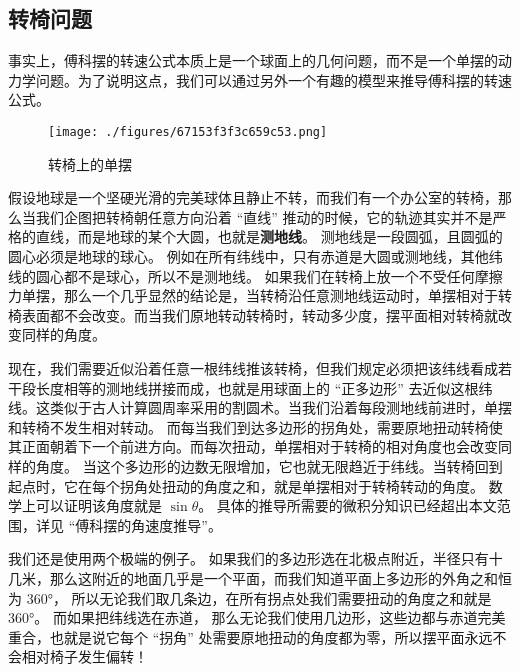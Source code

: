 \subsection{转椅问题}
事实上，傅科摆的转速公式本质上是一个球面上的几何问题，而不是一个单摆的动力学问题。为了说明这点，我们可以通过另外一个有趣的模型来推导傅科摆的转速公式。

\begin{figure}[ht]
\centering
\texttt{[image: ./figures/67153f3f3c659c53.png]}
\caption{转椅上的单摆} \label{fig_FouPen_2}
\end{figure}

假设地球是一个坚硬光滑的完美球体且静止不转，而我们有一个办公室的转椅，那么当我们企图把转椅朝任意方向沿着 “直线” 推动的时候，它的轨迹其实并不是严格的直线，而是地球的某个大圆，也就是\textbf{测地线}。 测地线是一段圆弧，且圆弧的圆心必须是地球的球心。 例如在所有纬线中，只有赤道是大圆或测地线，其他纬线的圆心都不是球心，所以不是测地线。 如果我们在转椅上放一个不受任何摩擦力单摆，那么一个几乎显然的结论是，当转椅沿任意测地线运动时，单摆相对于转椅表面都不会改变。而当我们原地转动转椅时，转动多少度，摆平面相对转椅就改变同样的角度。

现在，我们需要近似沿着任意一根纬线推该转椅，但我们规定必须把该纬线看成若干段长度相等的测地线拼接而成，也就是用球面上的 “正多边形” 去近似这根纬线。这类似于古人计算圆周率采用的割圆术。当我们沿着每段测地线前进时，单摆和转椅不发生相对转动。 而每当我们到达多边形的拐角处，需要原地扭动转椅使其正面朝着下一个前进方向。而每次扭动，单摆相对于转椅的相对角度也会改变同样的角度。 当这个多边形的边数无限增加，它也就无限趋近于纬线。当转椅回到起点时，它在每个拐角处扭动的角度之和，就是单摆相对于转椅转动的角度。 数学上可以证明该角度就是 $\sin\theta$。 具体的推导所需要的微积分知识已经超出本文范围，详见 “傅科摆的角速度推导”。

我们还是使用两个极端的例子。 如果我们的多边形选在北极点附近，半径只有十几米，那么这附近的地面几乎是一个平面，而我们知道平面上多边形的外角之和恒为 360°， 所以无论我们取几条边，在所有拐点处我们需要扭动的角度之和就是 360°。 而如果把纬线选在赤道， 那么无论我们使用几边形，这些边都与赤道完美重合，也就是说它每个 “拐角” 处需要原地扭动的角度都为零，所以摆平面永远不会相对椅子发生偏转！
